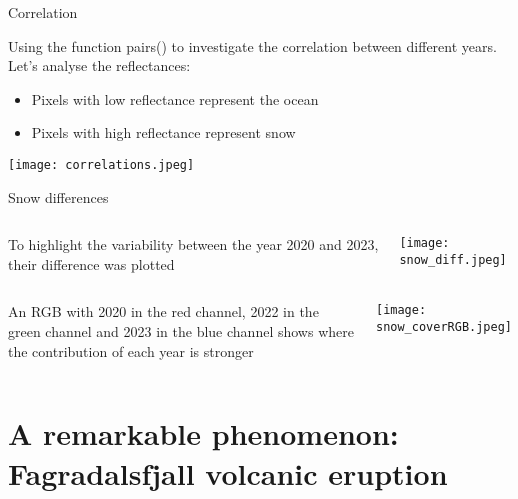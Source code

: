 \documentclass{beamer}
\begin{document}
\begin{frame}{Correlation}
     
    \tiny{Using the function pairs() to investigate the correlation between different years. Let's analyse the reflectances:}
    \begin{itemize}
     \item Pixels with low reflectance represent the ocean
     \item Pixels with high reflectance represent snow
   \end{itemize}   
   \texttt{[image: correlations.jpeg]}
\end{frame}

\begin{frame}{Snow differences}
    \begin{columns}
        \centering
        \small{To highlight the variability between the year 2020 and 2023, their difference was plotted}
         
        \centering
        \texttt{[image: snow\_diff.jpeg]}
    \end{columns}
    \begin{columns}
        \centering
        \small{An RGB with 2020 in the red channel, 2022 in the green channel and 2023 in the blue channel shows where the contribution of each year is stronger}
         
        \centering
        \texttt{[image: snow\_coverRGB.jpeg]}
    \end{columns}
\end{frame}


\section{A remarkable phenomenon: Fagradalsfjall volcanic eruption}
\end{document}
